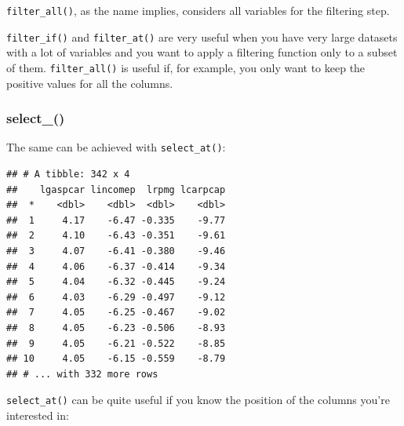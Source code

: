 \documentclass[]{gitbook}
\newenvironment{Shaded}{\begin{snugshade}}{\end{snugshade}}
\newcommand{\DecValTok}[1]{\textcolor[rgb]{0.00,0.00,0.81}{#1}}
\newcommand{\KeywordTok}[1]{\textcolor[rgb]{0.13,0.29,0.53}{\textbf{#1}}}
\newcommand{\NormalTok}[1]{#1}
\newcommand{\OperatorTok}[1]{\textcolor[rgb]{0.81,0.36,0.00}{\textbf{#1}}}
\newcommand{\StringTok}[1]{\textcolor[rgb]{0.31,0.60,0.02}{#1}}
\theoremstyle{definition}
\theoremstyle{definition}
\theoremstyle{definition}
\theoremstyle{remark}
\begin{document}
\texttt{filter\_all()}, as the name implies, considers all variables for
the filtering step.

\texttt{filter\_if()} and \texttt{filter\_at()} are very useful when you
have very large datasets with a lot of variables and you want to apply a
filtering function only to a subset of them. \texttt{filter\_all()} is
useful if, for example, you only want to keep the positive values for
all the columns.

\hypertarget{select_}{%
\subsubsection{select\_()}\label{select_}}

The same can be achieved with \texttt{select\_at()}:

\begin{Shaded}
\end{Shaded}

\begin{verbatim}
## # A tibble: 342 x 4
##    lgaspcar lincomep  lrpmg lcarpcap
##  *    <dbl>    <dbl>  <dbl>    <dbl>
##  1     4.17    -6.47 -0.335    -9.77
##  2     4.10    -6.43 -0.351    -9.61
##  3     4.07    -6.41 -0.380    -9.46
##  4     4.06    -6.37 -0.414    -9.34
##  5     4.04    -6.32 -0.445    -9.24
##  6     4.03    -6.29 -0.497    -9.12
##  7     4.05    -6.25 -0.467    -9.02
##  8     4.05    -6.23 -0.506    -8.93
##  9     4.05    -6.21 -0.522    -8.85
## 10     4.05    -6.15 -0.559    -8.79
## # ... with 332 more rows
\end{verbatim}

\texttt{select\_at()} can be quite useful if you know the position of
the columns you're interested in:

\begin{Shaded}
\end{Shaded}
\end{document}

